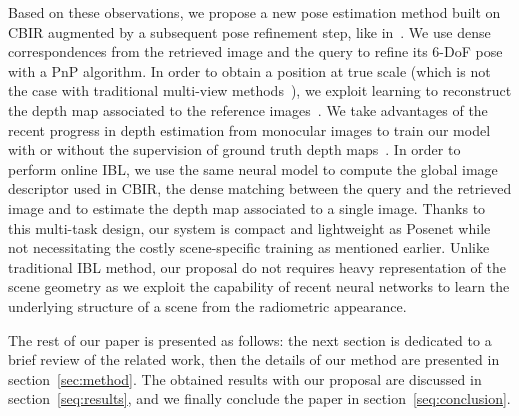 Based on these observations, we propose a new pose estimation method built on CBIR augmented by a subsequent pose refinement step, like in~\citep{Balntas2018}. We use dense correspondences from the retrieved image and the query to refine its 6-DoF pose with a PnP algorithm. In order to obtain a position at true scale (which is not the case with traditional multi-view methods~\citep{Hartley2003}), we exploit learning to reconstruct the depth map associated to the reference images~\citep{Tateno2017}. We take advantages of the recent progress in depth estimation from monocular images to train our model with or without the supervision of ground truth depth maps~\citep{Eigen2014, Godard2017, Zhou2017a}. In order to perform online IBL, we use the same neural model to compute the global image descriptor used in CBIR, the dense matching between the query and the retrieved image and to estimate the depth map associated to a single image. Thanks to this multi-task design, our system is compact and lightweight as Posenet while not necessitating the costly scene-specific training as mentioned earlier. Unlike traditional IBL method, our proposal do not requires heavy representation of the scene geometry as we exploit the capability of recent neural networks to learn the underlying structure of a scene from the radiometric appearance.

The rest of our paper is presented as follows: the next section is dedicated to a brief review of the related work, then the details of our method are presented in section~\ref{sec:method}. The obtained results with our proposal are discussed in section~\ref{seq:results}, and we finally conclude the paper in section~\ref{seq:conclusion}.
